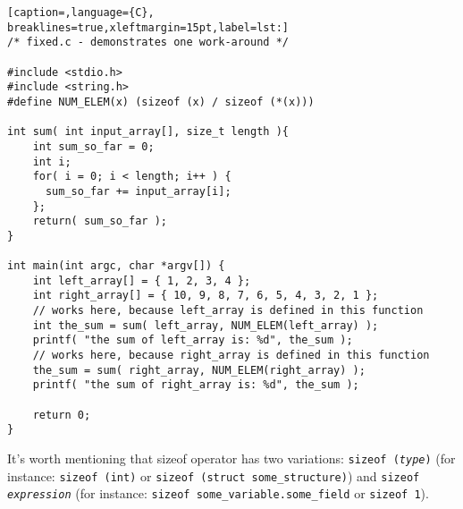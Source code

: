 \lstset{basicstyle=\scriptsize, numbers=left, captionpos=b, tabsize=4}
\begin{lstlisting}[caption=,language={C},
breaklines=true,xleftmargin=15pt,label=lst:]
/* fixed.c - demonstrates one work-around */
 
#include <stdio.h>
#include <string.h>
#define NUM_ELEM(x) (sizeof (x) / sizeof (*(x)))
 
int sum( int input_array[], size_t length ){
	int sum_so_far = 0;
	int i;
	for( i = 0; i < length; i++ ) {
	  sum_so_far += input_array[i];
	};
	return( sum_so_far );
}
 
int main(int argc, char *argv[]) {
	int left_array[] = { 1, 2, 3, 4 };
	int right_array[] = { 10, 9, 8, 7, 6, 5, 4, 3, 2, 1 };
	// works here, because left_array is defined in this function
	int the_sum = sum( left_array, NUM_ELEM(left_array) ); 
	printf( "the sum of left_array is: %d", the_sum );
	// works here, because right_array is defined in this function
	the_sum = sum( right_array, NUM_ELEM(right_array) ); 
	printf( "the sum of right_array is: %d", the_sum );
	
	return 0;
}
\end{lstlisting}

It's worth mentioning that sizeof operator has two variations: \texttt{sizeof
(\emph{type})} (for instance: \texttt{sizeof (int)} or \texttt{sizeof (struct
some\_structure)}) and \texttt{sizeof \emph{expression}} (for instance:
\texttt{sizeof some\_variable.some\_field} or \texttt{sizeof 1}).

